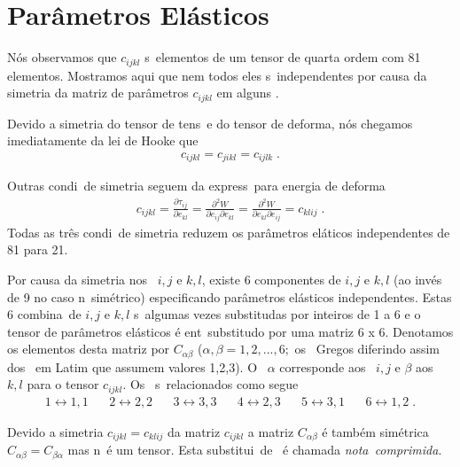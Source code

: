 
\section{Par\^ametros El\'asticos}

N\'os observamos que $c_{ijkl}$ s\ao\ elementos de um
tensor de quarta ordem com 81 elementos. Mostramos aqui
que nem todos eles s\ao\ independentes por causa da
simetria da matriz de par\^ametros $c_{ijkl}$ em alguns
\indices.

Devido a simetria do tensor de tens\ao\ e do tensor de
deforma\cao, n\'os chegamos imediatamente da lei de Hooke
que 
\begin{eqnarray}
c_{ijkl} = c_{jikl} = c_{ijlk} \; .
\end{eqnarray}

Outras condi\coes\ de simetria seguem da express\ao\ para
energia de deforma\cao
\begin{eqnarray}
c_{ijkl} = \frac{\partial \tau_{ij}}{\partial e_{kl}}
= \frac{\partial^2 W}{\partial e_{ij} \partial e_{kl}}
= \frac{\partial^2 W}{\partial e_{kl} \partial e_{ij}}
= c_{klij} \; .
\end{eqnarray}
Todas as tr\^es condi\coes\ de simetria reduzem os
par\^ametros el\'aticos independentes de 81 para 21.

Por causa da simetria nos \indices\ $i,j$ e $k,l$, existe
6 componentes de $i,j$ e $k,l$ (ao inv\'es  de 9 no caso
n\ao\ sim\'etrico) especificando par\^ametros el\'asticos
independentes. Estas 6 combina\coes\ de $i,j$ e $k,l$
s\ao\ algumas vezes substitu\ih das por inteiros de 1 a 6
e o tensor de par\^ametros el\'asticos \'e ent\ao\
substitu\ih do por uma matriz 6 x 6. Denotamos os
elementos desta matriz por $C_{\alpha \beta}$ ($\alpha,
\beta = 1,2,...,6;$ os \indices\ Gregos diferindo assim
dos \indices\ em Latim que assumem valores 1,2,3). O
\indice\ $\alpha$ corresponde aos \indices\ $i,j$ e 
$\beta$ aos \indices\ $k,l$ para o tensor $c_{ijkl}$.
Os \indices\ s\ao\ relacionados como segue
\begin{eqnarray*}
1 \leftrightarrow 1,1 \;\;\;\;\;\;
2 \leftrightarrow 2,2 \;\;\;\;\;\;
3 \leftrightarrow 3,3 \;\;\;\;\;\;
4 \leftrightarrow 2,3 \;\;\;\;\;\;
5 \leftrightarrow 3,1 \;\;\;\;\;\;
6 \leftrightarrow 1,2 \;.
\end{eqnarray*} 

Devido a simetria $c_{ijkl} = c_{klij}$ da matriz
$c_{ijkl}$ a matriz $C_{\alpha \beta}$ \'e tamb\'em
sim\'etrica $C_{\alpha \beta} = C_{\beta \alpha}$ mas
n\ao\ \'e um tensor. Esta substitui\cao\ de \indices\ \'e
chamada {\it nota\cao\ comprimida}.

